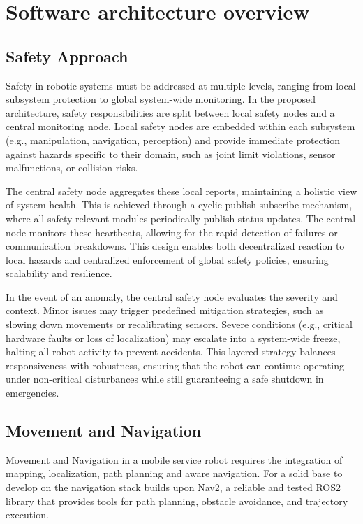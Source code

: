 \section{Software architecture overview}

\subsection{Safety Approach}
Safety in robotic systems must be addressed at multiple levels, ranging from local subsystem protection to global system-wide monitoring. In the proposed architecture, safety responsibilities are split between local safety nodes and a central monitoring node. Local safety nodes are embedded within each subsystem (e.g., manipulation, navigation, perception) and provide immediate protection against hazards specific to their domain, such as joint limit violations, sensor malfunctions, or collision risks.

The central safety node aggregates these local reports, maintaining a holistic view of system health. This is achieved through a cyclic publish-subscribe mechanism, where all safety-relevant modules periodically publish status updates. The central node monitors these heartbeats, allowing for the rapid detection of failures or communication breakdowns. This design enables both decentralized reaction to local hazards and centralized enforcement of global safety policies, ensuring scalability and resilience.

In the event of an anomaly, the central safety node evaluates the severity and context. Minor issues may trigger predefined mitigation strategies, such as slowing down movements or recalibrating sensors. Severe conditions (e.g., critical hardware faults or loss of localization) may escalate into a system-wide freeze, halting all robot activity to prevent accidents. This layered strategy balances responsiveness with robustness, ensuring that the robot can continue operating under non-critical disturbances while still guaranteeing a safe shutdown in emergencies.

\subsection{Movement and Navigation}
Movement and Navigation in a mobile service robot requires the integration of mapping, localization, path planning and aware navigation. For a solid base to develop on the navigation stack builds upon Nav2, a reliable and tested ROS2 library that provides tools for path planning, obstacle avoidance, and trajectory execution.

